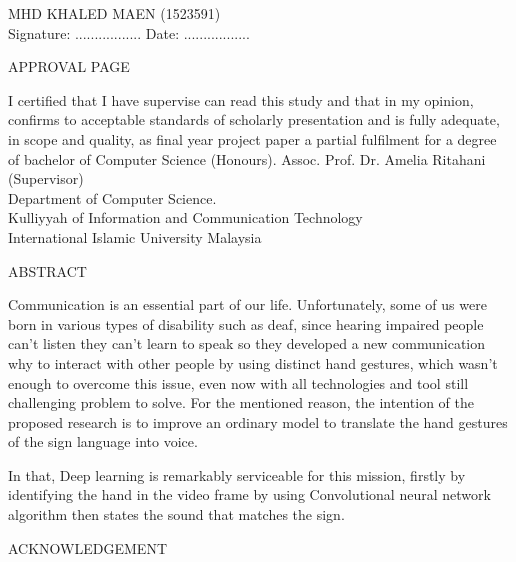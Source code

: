 \documentclass[12pt]{report}
\begin{document}
    \mbox{}
    \vfill
    MHD KHALED MAEN (1523591) \\
    \bigbreak
    Signature: ................. \quad \quad \quad \quad Date: .................
    \bigbreak

    \newpage
    \begin{center}
        \LARGE APPROVAL PAGE
    \end{center} 

        I certified that I have supervise can read this study and that in my opinion,
        confirms to acceptable standards of scholarly presentation and is fully adequate,
        in scope and quality, as final year project paper a partial fulfilment for a 
        degree of bachelor of Computer Science (Honours).
    \mbox{}
    \vfill
        Assoc. Prof. Dr. Amelia Ritahani (Supervisor)\\
    \bigbreak
        Department of Computer Science.\\
    \bigbreak
        Kulliyyah of Information and Communication Technology\\
    \bigbreak
        International Islamic University Malaysia
    \bigbreak

    \newpage

     \begin{center}
        \LARGE ABSTRACT
    \end{center}

        Communication is an essential part of our life.
        Unfortunately, some of us were born in various types of disability such as deaf,
        since hearing impaired people can't listen they can't learn to speak so they developed 
        a new communication why to interact with other people by using distinct hand gestures, 
        which wasn't enough to overcome this issue, even now with all technologies and tool still challenging problem to solve.
        For the mentioned reason, 
        the intention of the proposed research is to improve an ordinary model to translate the hand gestures of the sign language into voice.
        
        In that, Deep learning is remarkably serviceable for this mission, 
        firstly by identifying the hand in the video frame by using Convolutional
        neural network algorithm then states the sound that matches the sign.
    

    \newpage
    \begin{center}
        \LARGE ACKNOWLEDGEMENT
    \end{center} 
\end{document}
